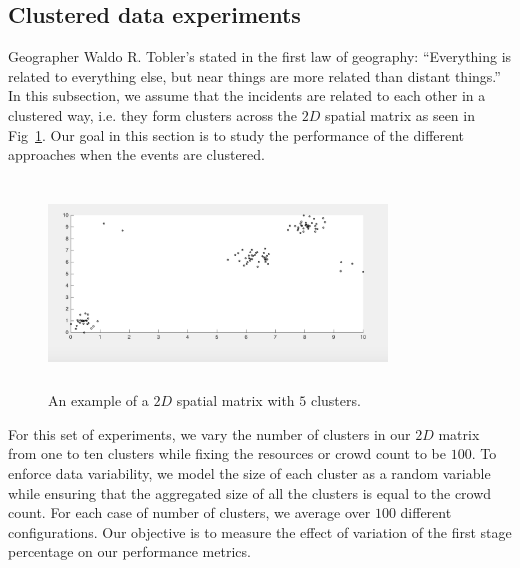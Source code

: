 \documentclass{acm_proc_article-sp}
\begin{document}
\subsection{Clustered data experiments}
Geographer Waldo R. Tobler's stated in the first law of geography: ``Everything is related to everything else, but near things are more related than distant things.'' In this subsection, we assume that the incidents are related to each other in a clustered way, i.e. they form clusters across the $2D$ spatial matrix as seen in Fig~\ref{fig: clust}. Our goal in this section is to study the performance of the different approaches when the events are clustered.\par
\begin{figure}[!h]
\centering
\includegraphics[width=9cm ,height=5.5cm]{figuresPng/clust.png}
\caption{An example of a $2D$ spatial matrix with $5$ clusters.}\label{fig: clust}
\end{figure}

For this set of experiments, we vary the number of clusters in our $2D$ matrix from one to ten clusters while fixing the resources or crowd count to be $100$. To enforce data variability, we model the size of each cluster as a random variable while ensuring that the aggregated size of all the clusters is equal to the crowd count. For each case of number of clusters, we average over $100$ different configurations. Our objective is to measure the effect of variation of the first stage percentage on our performance metrics.\par
\end{document}
